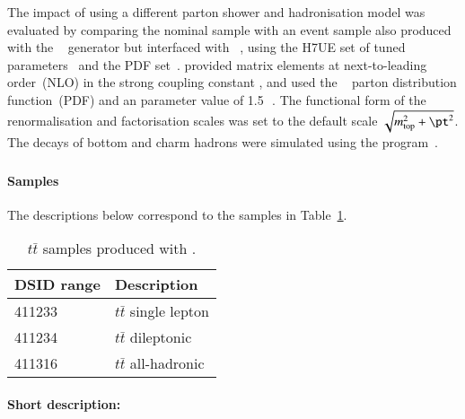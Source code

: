 The impact of using a different parton shower and hadronisation model was evaluated
by comparing the nominal \ttbar sample with an event sample also produced with the
\POWHEGBOX[v2]~\cite{Frixione:2007nw,Nason:2004rx,Frixione:2007vw,Alioli:2010xd} 
generator but interfaced with \HERWIG[7.04]~\cite{Bahr:2008pv,Bellm:2015jjp}, using the H7UE set
of tuned parameters~\cite{Bellm:2015jjp} and the \MMHT[lo] PDF set~\cite{Harland-Lang:2014zoa}. 
\POWHEGBOX provided matrix elements at next-to-leading order~(NLO) in the 
strong coupling constant \alphas, and used the \NNPDF[3.0nlo]~\cite{Ball:2014uwa} 
parton distribution function~(PDF) and an \hdamp parameter value of 1.5\,\mtop~\cite{ATL-PHYS-PUB-2016-020}.
The functional form of the renormalisation and factorisation scales was
set to the default scale $\sqrt{m_\text{top}^2 + \pt^2}$.
The decays of bottom and charm hadrons
were simulated using the \EVTGEN[1.6.0] program~\cite{Lange:2001uf}. 

\subsubsection[Powheg+Herwig7.13]{\POWHER[7.13]}

\paragraph{Samples}

The descriptions below correspond to the samples in Table~\ref{tab:ttbar_PH713}.
\begin{table}[htbp]
\begin{center}
\caption{$t\bar{t}$ samples produced with \POWHER[7.13]. }
\label{tab:ttbar_PH713}
\begin{tabular}{ l | l }
\hline
DSID range & Description \\
\hline
411233 & $t\bar{t}$ single lepton  \\
411234 & $t\bar{t}$ dileptonic  \\
411316 & $t\bar{t}$ all-hadronic  \\
\hline
\end{tabular}
\end{center}
\end{table}


\paragraph{Short description:}

